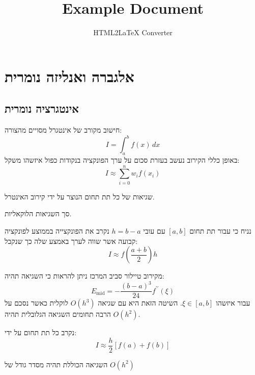 \documentclass{tstextbook}
\begin{document}
\title{Example Document}
\author{HTML2LaTeX Converter}
\maketitle

\section{אלגברה ואנליזה נומרית}

\subsection{אינטגרציה נומרית}

\begin{definition}
חישוב מקורב של אינטגרל מסויים מהצורה:
$$I=\int_{a}^{b}f(x)\,d x$$
באופן כללי הקירוב נעשב בעזרת סכום על ערך הפונקציה בנקודות כפול איזשהו משקל:
$$I\approx\sum_{i=0}^{n}w_{i}f(x_{i})$$

\end{definition}
\begin{definition}
שגיאות של כל תת תחום הנוצר על ידי קירוב האינטרל.

\end{definition}
\begin{definition}
סך השגיאות הלוקאליות.

\end{definition}
\begin{definition}
נניח כי עבור תת תחום \([a,b]\) עם עובי \(h=b-a\) נקרב את הפונקצייה בממוצע לפונקציה קבועה אשר שווה לערך באמצע שלה כך שנקבל:
$$I\approx f\left({\frac{a+b}{2}}\right)h$$

\end{definition}
\begin{corollary}
מקירוב טיילור סביב המרכז ניתן להראות כי השגיאה תהיה:
$$E_{\mathrm{mid}}=-{\frac{(b-a)^{3}}{24}}f^{\prime\prime}(\xi)$$
עבור איזשהו \(\xi \in [a,b]\). השיטה הזאת היא עם שגיאה \(O(h^{3})\) לוקלית כאשר נסכם על הרבה תחומים השגיאה הגלובלית תהיה \(O(h^{2})\).

\end{corollary}
\begin{definition}
נקרב כל תת תחום על ידי:
$$I\approx\frac{h}{2}\left[f(a)+f(b)\right]$$

\end{definition}
\begin{corollary}
השגיאה הכוללת תהיה מסדר גודל של \(O(h^{2})\)

\end{corollary}
\end{document}
